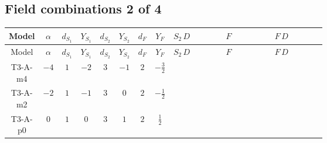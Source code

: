 \documentclass[8pt]{article}
\begin{document}
\begin{landscape}
\subsection*{Field combinations 2 of 4}
\begin{longtable}{@{}cccccccc >{\raggedright\arraybackslash}p{0.21\linewidth} >{\raggedright\arraybackslash}p{0.21\linewidth} >{\raggedright\arraybackslash}p{0.21\linewidth}@{}}
\toprule
Model & $\alpha$ & $d_{S_1}$ & $Y_{S_1}$ & $d_{S_2}$ & $Y_{S_2}$ & $d_F$ & $Y_F$ & $S_2\,D$ & $F$ & $F\,D$ \\
\midrule
\endfirsthead
\toprule
Model & $\alpha$ & $d_{S_1}$ & $Y_{S_1}$ & $d_{S_2}$ & $Y_{S_2}$ & $d_F$ & $Y_F$ & $S_2\,D$ & $F$ & $F\,D$ \\
\midrule
\endhead
T3-A-m4 & $-4$ & $1$ & $-2$ & $3$ & $-1$ & $2$ & $-\frac{3}{2}$ & \scriptsize\adjustbox{max width=\linewidth}{$\begin{gathered} +D_{\mu _1}\left(S_{2,j_1}\right){}^{\dagger } D_{\mu _1}\left(S_{2,j_1}\right)\end{gathered}$} & \scriptsize\adjustbox{max width=\linewidth}{$\begin{gathered} -\overline{F_{j_1,r_1}}\, F_{j_1,r_1} M_F\end{gathered}$} & \scriptsize\adjustbox{max width=\linewidth}{$\begin{gathered} +i \overline{F_{j_1,r_1}}\, \gamma ^{\mu _1}\, D_{\mu _1}\left(F_{j_1,r_1}\right)\end{gathered}$} \\
\midrule
T3-A-m2 & $-2$ & $1$ & $-1$ & $3$ & $0$ & $2$ & $-\frac{1}{2}$ & \scriptsize\adjustbox{max width=\linewidth}{$\begin{gathered} +D_{\mu _1}\left(S_{2,j_1}\right){}^{\dagger } D_{\mu _1}\left(S_{2,j_1}\right)\end{gathered}$} & \scriptsize\adjustbox{max width=\linewidth}{$\begin{gathered} -\overline{F_{j_1,r_1}}\, F_{j_1,r_1} M_F\end{gathered}$} & \scriptsize\adjustbox{max width=\linewidth}{$\begin{gathered} +i \overline{F_{j_1,r_1}}\, \gamma ^{\mu _1}\, D_{\mu _1}\left(F_{j_1,r_1}\right)\end{gathered}$} \\
\midrule
T3-A-p0 & $0$ & $1$ & $0$ & $3$ & $1$ & $2$ & $\frac{1}{2}$ & \scriptsize\adjustbox{max width=\linewidth}{$\begin{gathered} +D_{\mu _1}\left(S_{2,j_1}\right){}^{\dagger } D_{\mu _1}\left(S_{2,j_1}\right)\end{gathered}$} & \scriptsize\adjustbox{max width=\linewidth}{$\begin{gathered} -\overline{F_{j_1,r_1}}\, F_{j_1,r_1} M_F\end{gathered}$} & \scriptsize\adjustbox{max width=\linewidth}{$\begin{gathered} +i \overline{F_{j_1,r_1}}\, \gamma ^{\mu _1}\, D_{\mu _1}\left(F_{j_1,r_1}\right)\end{gathered}$} \\

\end{longtable}
\end{landscape}
\end{document}
